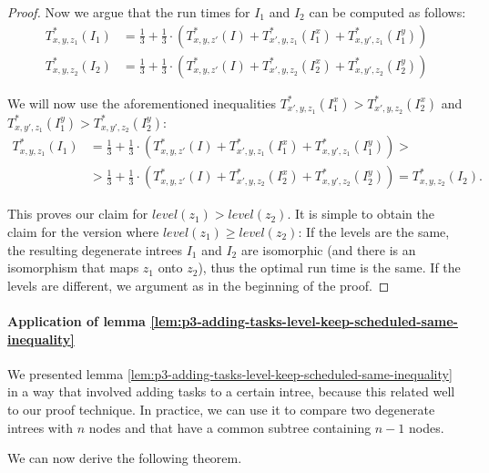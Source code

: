 \begin{proof}
  Now we argue that the run times for $I_1$ and $I_2$ can be computed as follows:
  \begin{align*}
    T^*_{x,y,z_1}(I_1) & = 
      \frac{1}{3} + 
      \frac{1}{3}\cdot \left( 
        T_{x,y,z'}^*(I) + 
        T^*_{x',y,z_1}(I^x_{1}) +
        T^*_{x,y',z_1}(I^y_{1}) 
      \right)
      \\
    T^*_{x,y,z_2}(I_2) & = 
      \frac{1}{3} + 
      \frac{1}{3}\cdot \left( 
        T_{x,y,z'}^*(I) + 
        T^*_{x',y,z_2}(I^x_{2}) +
        T^*_{x,y',z_2}(I^y_{2}) 
      \right)
  \end{align*}

  We will now use the aforementioned inequalities $T^*_{x',y,z_1}(I^x_{1}) > T^*_{x',y,z_2}(I^x_{2})$ and $T^*_{x,y',z_1}(I^y_{1}) > T^*_{x,y',z_2}(I^y_{2})$:
\begin{align*}
    T^*_{x,y,z_1}(I_1) & = 
      \frac{1}{3} + 
      \frac{1}{3}\cdot \left( 
        T_{x,y,z'}^*(I) + 
        T^*_{x',y,z_1}(I^x_{1}) +
        T^*_{x,y',z_1}(I^y_{1}) 
      \right)
      > 
      \\
      & >
      \frac{1}{3} + 
      \frac{1}{3}\cdot \left( 
        T_{x,y,z'}^*(I) + 
        T^*_{x',y,z_2}(I^x_{2}) +
        T^*_{x,y',z_2}(I^y_{2}) 
      \right) 
      = T^*_{x,y,z_2}(I_2).
  \end{align*}

  This proves our claim for $level(z_1) > level(z_2)$. It is simple to obtain the claim for the version where $level(z_1) \geq level(z_2)$: If the levels are the same, the resulting degenerate intrees $I_1$ and $I_2$ are isomorphic (and there is an isomorphism that maps $z_1$ onto $z_2$), thus the optimal run time is the same. If the levels are different, we argument as in the beginning of the proof.
\end{proof}

\paragraph{Application of lemma \ref{lem:p3-adding-tasks-level-keep-scheduled-same-inequality}}

We presented lemma \ref{lem:p3-adding-tasks-level-keep-scheduled-same-inequality} in a way that involved adding tasks to a certain intree, because this related well to our proof technique. In practice, we can use it to compare two degenerate intrees with $n$ nodes and that have a common subtree containing $n-1$ nodes.

We can now derive the following theorem.

